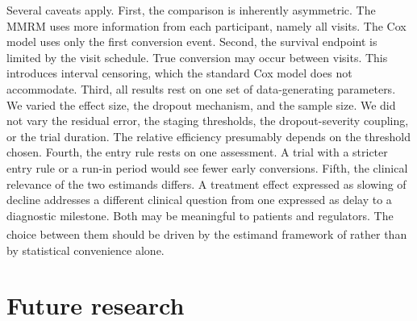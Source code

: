 \documentclass[
  11pt,
]{article}
\begin{document}
Several caveats apply. First, the comparison is
inherently asymmetric. The MMRM uses more information from
each participant, namely all visits. The Cox model uses
only the first conversion event. Second, the survival
endpoint is limited by the visit schedule. True conversion
may occur between visits. This introduces interval
censoring, which the standard Cox model does not
accommodate. Third, all results rest on one set of
data-generating parameters. We varied the effect size, the
dropout mechanism, and the sample size. We did not vary
the residual error, the staging thresholds, the
dropout-severity coupling, or the trial duration. The
relative efficiency presumably depends on the threshold
chosen. Fourth, the entry rule rests on one assessment.
A trial with a stricter entry rule or a run-in period
would see fewer early conversions. Fifth, the clinical
relevance of the two estimands differs. A treatment effect
expressed as slowing of decline addresses a different
clinical question from one expressed as delay to a
diagnostic milestone. Both may be meaningful to patients
and regulators. The choice between them should be driven
by the estimand framework of\textsuperscript{} rather than by
statistical convenience alone.

\section{Future research}\label{future-research}
\end{document}
